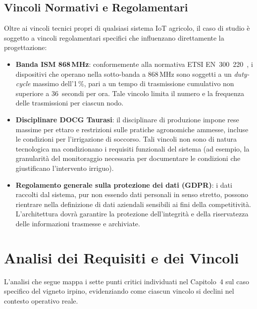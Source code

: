 \subsection{Vincoli Normativi e Regolamentari}

Oltre ai vincoli tecnici propri di qualsiasi sistema IoT agricolo, il caso di studio è soggetto a vincoli regolamentari specifici che influenzano direttamente la progettazione:

\begin{itemize}
	\item \textbf{Banda ISM 868\,MHz}: conformemente alla normativa ETSI EN~300~220~\cite{etsi300220}, i dispositivi che operano nella sotto-banda a 868\,MHz sono soggetti a un \textit{duty-cycle} massimo dell'1\,\%, pari a un tempo di trasmissione cumulativo non superiore a 36~secondi per ora. Tale vincolo limita il numero e la frequenza delle trasmissioni per ciascun nodo.

	\item \textbf{Disciplinare DOCG Taurasi}: il disciplinare di produzione impone rese massime per ettaro e restrizioni sulle pratiche agronomiche ammesse, incluse le condizioni per l'irrigazione di soccorso. Tali vincoli non sono di natura tecnologica ma condizionano i requisiti funzionali del sistema (ad esempio, la granularità del monitoraggio necessaria per documentare le condizioni che giustificano l'intervento irriguo).

	\item \textbf{Regolamento generale sulla protezione dei dati (GDPR)}: i dati raccolti dal sistema, pur non essendo dati personali in senso stretto, possono rientrare nella definizione di dati aziendali sensibili ai fini della competitività. L'architettura dovrà garantire la protezione dell'integrità e della riservatezza delle informazioni trasmesse e archiviate.
\end{itemize}


\section{Analisi dei Requisiti e dei Vincoli}

L'analisi che segue mappa i sette punti critici individuati nel Capitolo~4 sul caso specifico del vigneto irpino, evidenziando come ciascun vincolo si declini nel contesto operativo reale.

